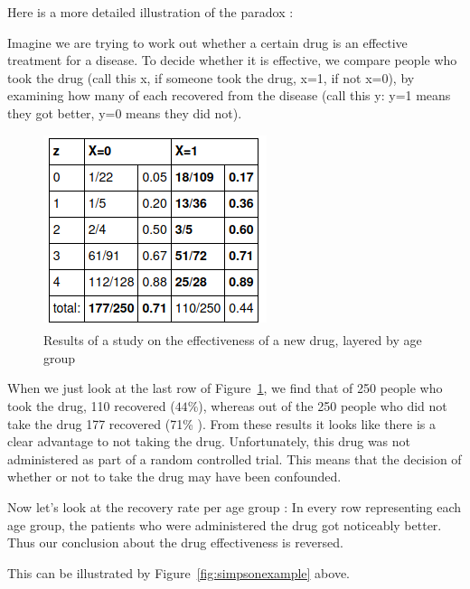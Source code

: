 \documentclass{article}
\begin{document}
Here is a more detailed illustration of the paradox : 

Imagine we are trying to work out whether a certain drug is an effective treatment for a disease. To decide whether it is effective, we compare people who took the drug (call this x, if someone took the drug, x=1, if not x=0), by examining how many of each recovered from the disease (call this y: y=1 means they got better, y=0 means they did not).


\begin{figure}[h]
\centering
\includegraphics[width=0.4 \textwidth]{../figures/simpson 1.png}
\caption{Results of a study on the effectiveness of a new drug, layered by age group }
\label{fig:studyage}
\end{figure}

When we just look at the last row of Figure~\ref{fig:studyage}, we find that of 250 people who took the drug, 110 recovered ($44 \% $), whereas out of the 250 people who did not take the drug 177 recovered (71\% ). From these results it looks like there is a clear advantage to not taking the drug. Unfortunately, this drug was not administered as part of a random controlled trial. This means that the decision of whether or not to take the drug may have been confounded.

Now let's look at the recovery rate per age group : In every row representing each age group, the patients who were administered the drug got noticeably better.
Thus our conclusion about the drug effectiveness is reversed.

This can be illustrated by Figure~\ref{fig:simpsonexample} above.
\end{document}

